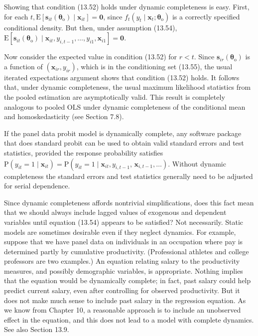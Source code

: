 \documentclass[10pt]{article}
\begin{document}
Showing that condition (13.52) holds under dynamic completeness is easy. First, for each $t, \mathrm{E}\left[\mathbf{s}_{i t}\left(\boldsymbol{\theta}_{\mathrm{o}}\right) \mid \mathbf{x}_{i t}\right]=\mathbf{0}$, since $f_{t}\left(y_{t} \mid \mathbf{x}_{t} ; \boldsymbol{\theta}_{\mathrm{o}}\right)$ is a correctly specified conditional density. But then, under assumption (13.54),\\
$\mathrm{E}\left[\mathbf{s}_{i t}\left(\boldsymbol{\theta}_{\mathrm{o}}\right) \mid \mathbf{x}_{i t}, y_{i, t-1}, \ldots, y_{i 1}, \mathbf{x}_{i 1}\right]=\mathbf{0}$.

Now consider the expected value in condition (13.52) for $r<t$. Since $\mathbf{s}_{i r}\left(\boldsymbol{\theta}_{\mathrm{o}}\right)$ is a function of $\left(\mathbf{x}_{i r}, y_{i r}\right)$, which is in the conditioning set (13.55), the usual iterated expectations argument shows that condition (13.52) holds. It follows that, under dynamic completeness, the usual maximum likelihood statistics from the pooled estimation are asymptotically valid. This result is completely analogous to pooled OLS under dynamic completeness of the conditional mean and homoskedasticity (see Section 7.8).

If the panel data probit model is dynamically complete, any software package that does standard probit can be used to obtain valid standard errors and test statistics, provided the response probability satisfies $\mathrm{P}\left(y_{i t}=1 \mid \mathbf{x}_{i t}\right)=\mathrm{P}\left(y_{i t}=1 \mid \mathbf{x}_{i t}, y_{i, t-1}\right.$, $\left.\mathbf{x}_{i, t-1}, \ldots\right)$. Without dynamic completeness the standard errors and test statistics generally need to be adjusted for serial dependence.

Since dynamic completeness affords nontrivial simplifications, does this fact mean that we should always include lagged values of exogenous and dependent variables until equation (13.54) appears to be satisfied? Not necessarily. Static models are sometimes desirable even if they neglect dynamics. For example, suppose that we have panel data on individuals in an occupation where pay is determined partly by cumulative productivity. (Professional athletes and college professors are two examples.) An equation relating salary to the productivity measures, and possibly demographic variables, is appropriate. Nothing implies that the equation would be dynamically complete; in fact, past salary could help predict current salary, even after controlling for observed productivity. But it does not make much sense to include past salary in the regression equation. As we know from Chapter 10, a reasonable approach is to include an unobserved effect in the equation, and this does not lead to a model with complete dynamics. See also Section 13.9.
\end{document}

